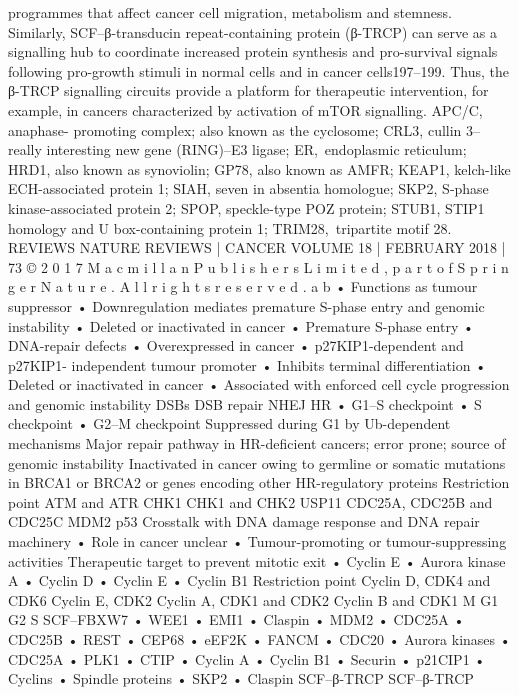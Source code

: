 programmes that affect cancer cell migration, metabolism and stemness. Similarly, SCF–β-transducin repeat-containing
protein (β-TRCP) can serve as a signalling hub to coordinate increased protein synthesis and pro-survival signals following
pro-growth stimuli in normal cells and in cancer cells197–199. Thus, the β-TRCP signalling circuits provide a platform for
therapeutic intervention, for example, in cancers characterized by activation of mTOR signalling. APC/C, anaphase-
promoting complex; also known as the cyclosome; CRL3, cullin 3–really interesting new gene (RING)–E3 ligase;
ER, endoplasmic reticulum; HRD1, also known as synoviolin; GP78, also known as AMFR; KEAP1, kelch-like ECH-associated
protein 1; SIAH, seven in absentia homologue; SKP2, S‑phase kinase-associated protein 2; SPOP, speckle-type POZ protein;
STUB1, STIP1 homology and U box-containing protein 1; TRIM28, tripartite motif 28.
REVIEWS
NATURE REVIEWS | CANCER
 VOLUME 18 | FEBRUARY 2018 | 73
©
 2
0
1
7
 M
a
c
m
i
l
l
a
n
 P
u
b
l
i
s
h
e
r
s
 L
i
m
i
t
e
d
,
 p
a
r
t
 o
f
 S
p
r
i
n
g
e
r
 N
a
t
u
r
e
.
 A
l
l
 r
i
g
h
t
s
 r
e
s
e
r
v
e
d
.
a
b
• Functions as tumour suppressor
• Downregulation mediates
   premature S-phase entry and
   genomic instability
• Deleted or inactivated in cancer
• Premature S-phase entry
• DNA-repair defects
• Overexpressed in cancer
• p27KIP1-dependent and p27KIP1-
   independent tumour promoter
• Inhibits terminal diﬀerentiation
• Deleted or inactivated in cancer
• Associated with enforced cell
   cycle progression and genomic
   instability
DSBs
DSB repair
NHEJ
HR
• G1–S checkpoint
• S checkpoint
• G2–M checkpoint
Suppressed during G1 by
Ub-dependent mechanisms
Major repair pathway in
HR-deﬁcient cancers;
error prone; source of
genomic instability
Inactivated in cancer owing to
germline or somatic mutations in
BRCA1 or BRCA2 or genes encoding
other HR-regulatory proteins
Restriction point
ATM and ATR
CHK1
CHK1
and CHK2
USP11
CDC25A,
CDC25B and
CDC25C
MDM2
p53
Crosstalk with DNA damage response and
DNA repair machinery
• Role in cancer unclear
• Tumour-promoting or
   tumour-suppressing
   activities
Therapeutic target to
prevent mitotic exit
• Cyclin E
• Aurora kinase A
• Cyclin D
• Cyclin E
• Cyclin B1
Restriction
point
Cyclin D, CDK4
and CDK6
Cyclin E,
CDK2
Cyclin A, CDK1
and CDK2
Cyclin B and CDK1
M
G1
G2
S
SCF–FBXW7
• WEE1
• EMI1
• Claspin
• MDM2
• CDC25A
• CDC25B
• REST
• CEP68
• eEF2K
• FANCM
• CDC20
• Aurora kinases
• CDC25A
• PLK1
• CTIP
• Cyclin A
• Cyclin B1
• Securin
• p21CIP1
• Cyclins
• Spindle proteins
• SKP2
• Claspin
SCF–β-TRCP
SCF–β-TRCP
